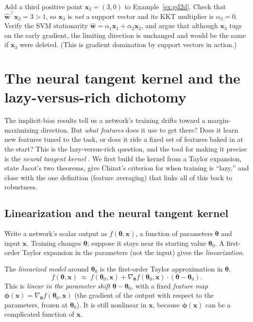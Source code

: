 \begin{problem}
\label{ex:nonsupport}
Add a third positive point $\mathbf{x}_3=(3,0)$ to
Example~\ref{ex:gd2d}. Check that $\widehat{\mathbf{w}}^\top\mathbf{x}_3
= 3 > 1$, so $\mathbf{x}_3$ is \emph{not} a support vector and its KKT
multiplier is $\alpha_3=0$. Verify the SVM stationarity
$\widehat{\mathbf{w}} = \alpha_1\mathbf{x}_1 + \alpha_2\mathbf{x}_2$, and
argue that although $\mathbf{x}_3$ tugs on the early gradient, the limiting
direction is unchanged and would be the same if $\mathbf{x}_3$ were
deleted. (This is gradient domination by support vectors in action.)
\end{problem}


\section{The neural tangent kernel and the lazy-versus-rich dichotomy}
\label{sec:ntk}

The implicit-bias results tell us a network's training drifts toward a
margin-maximizing direction. But \emph{what features} does it use to get
there? Does it learn new features tuned to the task, or does it ride a
fixed set of features baked in at the start? This is the lazy-versus-rich
question, and the tool for making it precise is the \emph{neural tangent
kernel} \citep{jacot2018}. We first build the kernel from a Taylor
expansion, state Jacot's two theorems, give Chizat's criterion for when
training is ``lazy,'' and close with the one definition (feature
averaging) that links all of this back to robustness.

\subsection{Linearization and the neural tangent kernel}

Write a network's scalar output as $f(\boldsymbol\theta, \mathbf{x})$, a
function of parameters $\boldsymbol\theta$ and input $\mathbf{x}$.
Training changes $\boldsymbol\theta$; suppose it stays near its starting
value $\boldsymbol\theta_0$. A first-order Taylor expansion in the
parameters (not the input) gives the \emph{linearization}.

\begin{definition}
The \emph{linearized model} around $\boldsymbol\theta_0$ is the first-order
Taylor approximation in $\boldsymbol\theta$,
\[
  f(\boldsymbol\theta, \mathbf{x}) \;\approx\;
  f(\boldsymbol\theta_0, \mathbf{x})
  + \nabla_{\boldsymbol\theta} f(\boldsymbol\theta_0, \mathbf{x})
    \cdot (\boldsymbol\theta - \boldsymbol\theta_0).
\]
This is \emph{linear in the parameter shift}
$\boldsymbol\theta-\boldsymbol\theta_0$, with a fixed \emph{feature map}
$\boldsymbol\phi(\mathbf{x}) =
\nabla_{\boldsymbol\theta} f(\boldsymbol\theta_0, \mathbf{x})$ (the
gradient of the output with respect to the parameters, frozen at
$\boldsymbol\theta_0$). It is still nonlinear in $\mathbf{x}$, because
$\boldsymbol\phi(\mathbf{x})$ can be a complicated function of
$\mathbf{x}$.
\end{definition}

